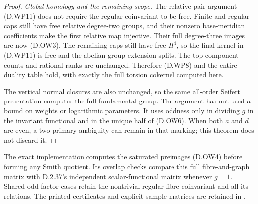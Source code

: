 \begin{proof}
\emph{Global homology and the remaining scope.}
The relative pair argument (D.WP11) does not
require the regular coinvariant to be free.
Finite and regular caps still have free
relative degree-two groups, and their
nonzero base-meridian coefficients make the
first relative map injective. Their full
degree-three images are now (D.OW3).
The remaining caps still have free
$H^4$, so the final kernel in (D.WP11) is
free and the abelian-group extension splits.
The top component counts and rational ranks
are unchanged. Therefore (D.WP8) and the
entire duality table hold, with exactly the
full torsion cokernel computed here.

The vertical normal closures are also unchanged,
so the same all-order Seifert presentation
computes the full fundamental group.
The argument has not used a bound on weights
or logarithmic parameters. It uses oddness
only in dividing $g$ in the invariant functional
and in the unique half of (D.OW6). When both
$a$ and $d$ are even, a two-primary ambiguity
can remain in that marking; this theorem
does not discard it.
\end{proof}

The exact implementation computes the saturated
preimages (D.OW4) before forming any Smith quotient.
Its overlap checks compare this full fibre-and-graph
matrix with D.2.37's independent scalar-functional
matrix whenever $g=1$. Shared odd-factor cases
retain the nontrivial regular fibre coinvariant
and all its relations. The printed certificates
and explicit sample matrices are retained in
.
